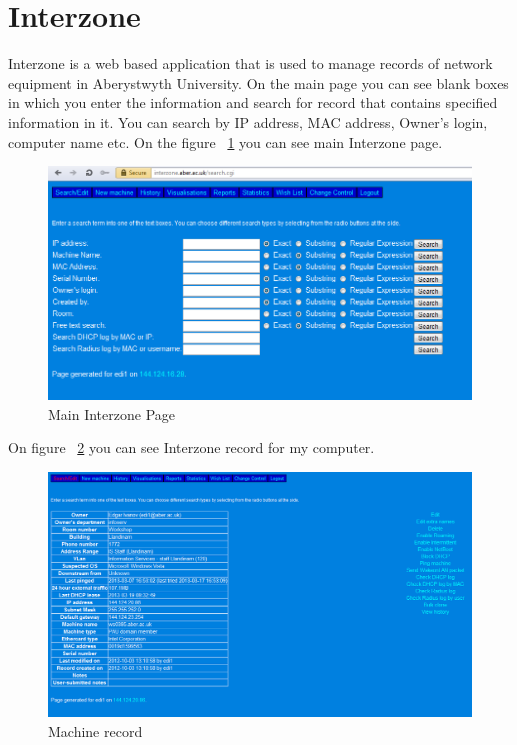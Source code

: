 \documentclass[10pt,a4paper,headinclude=true]{report}
\begin{document}
\section{Interzone}
Interzone is a web based application that is used to manage records of network equipment in Aberystwyth University. On the main page you can see blank boxes in which you enter the information and search for record that contains specified information in it. You can search by IP address, MAC address, Owner's login, computer name etc. On the figure ~\ref{fig:main_interzone_page} you can see main Interzone page.

\begin{figure}[htbp]
\centering
\centerline{\includegraphics[scale=0.5]{./main_interzone_page}}
\caption{Main Interzone Page}
\label{fig:main_interzone_page}
\end{figure}

On figure ~\ref{fig:machine_record} you can see Interzone record for my computer.

\begin{figure}[htbp]
\centering
\centerline{\includegraphics[scale=0.5]{./machine_record}}
\caption{Machine record}
\label{fig:machine_record}
\end{figure}
\end{document}
